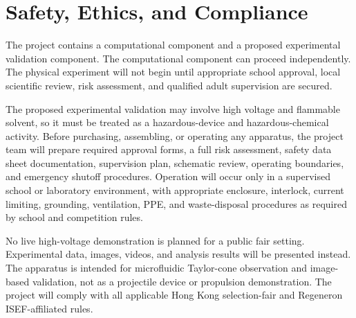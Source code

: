 \section{Safety, Ethics, and Compliance}

The project contains a computational component and a proposed experimental validation component. The computational component can proceed independently. The physical experiment will not begin until appropriate school approval, local scientific review, risk assessment, and qualified adult supervision are secured.

The proposed experimental validation may involve high voltage and flammable solvent, so it must be treated as a hazardous-device and hazardous-chemical activity. Before purchasing, assembling, or operating any apparatus, the project team will prepare required approval forms, a full risk assessment, safety data sheet documentation, supervision plan, schematic review, operating boundaries, and emergency shutoff procedures. Operation will occur only in a supervised school or laboratory environment, with appropriate enclosure, interlock, current limiting, grounding, ventilation, PPE, and waste-disposal procedures as required by school and competition rules.

No live high-voltage demonstration is planned for a public fair setting. Experimental data, images, videos, and analysis results will be presented instead. The apparatus is intended for microfluidic Taylor-cone observation and image-based validation, not as a projectile device or propulsion demonstration. The project will comply with all applicable Hong Kong selection-fair and Regeneron ISEF-affiliated rules.
